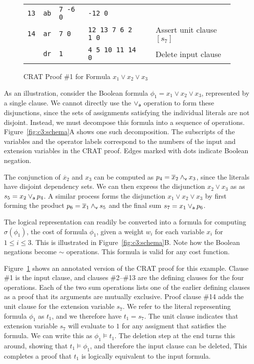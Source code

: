 \documentclass{llncs}
\newcommand{\pand}{\mathbin{\land_{\sf v}}}
\newcommand{\por}{\mathbin{\lor_{\sf a}}}
\newcommand{\tautology}{1}
\newcommand{\obar}[1]{\overline{#1}}
\newcommand{\oneminus}{{\sim}}
\newcommand{\turnstile}{\models}
\newcommand{\cost}{\sigma}
\begin{document}
\begin{figure}
{\begin{tabular}{llllll}
    {\tt 13} & {\tt ab}  & {\tt  7 -6 0}    & {\tt -12 0} & &  \\  %
    {\tt 14} & {\tt ar}  & {\tt 7 0} & {\tt 12 13 7 6 2 1 0} & & Assert unit clause $[s_7]$ \\
             & {\tt dr}  & {\tt 1}  & {\tt 4 5 10 11 14 0} & & Delete input clause \\
  \end{tabular}
  }
  \caption{CRAT Proof \#1 for Formula $x_1 \lor x_2 \lor x_3$}
  \label{fig:c3:crat}
\end{figure}
    
As an illustration, consider the Boolean formula
$\phi_1 = x_1 \lor x_2 \lor x_3$,
represented by a single clause.  We cannot directly use the
$\por$ operation to form these disjunctions, since the sets of assignments
satisfying the individual literals are not disjoint.  Instead, we must
decompose this formula into a sequence of operations.
Figure~\ref{fig:c3:schema}A shows one such decomposition.
The subscripts of the variables and the operator labels correspond to
the numbers of the input and extension variables in the CRAT proof.
Edges marked with dots indicate Boolean negation.

The conjunction of $\obar{x}_2$ and $x_3$ can be computed as $p_4 =
\obar{x}_2 \pand x_3$, since the literals have disjoint dependency
sets. We can then express the disjunction $x_2 \lor x_3$ as
as $s_5 = x_2 \por p_4$.  A similar process forms the
disjunction $x_1 \lor x_2 \lor x_3$ by first forming the product $p_6
= \obar{x}_1 \pand s_5$ and the final sum $s_7 = x_1 \por p_6$.

The logical representation can readily be converted into a formula for
computing $\cost(\phi_1)$, the cost of formula $\phi_1$, given a weight
$w_i$ for each variable $x_i$ for $1 \leq i \leq 3$.  This is
illustrated in Figure~\ref{fig:c3:schema}B\@.  Note how the Boolean
negations become $\oneminus$ operations.  This formula is valid for
any cost function.

Figure~\ref{fig:c3:crat} shows an annotated version of the CRAT proof
for this example.  Clause \#1
is the input clause, and
clauses \#2--\#13 are the defining clauses for the four operations.
Each of the two sum operations lists one of the earlier defining
clauses as a proof that its arguments are mutually exclusive.
Proof clause \#14 adds the unit clause for the extension variable $s_7$.
We refer to the literal representing formula $\phi_1$ as $t_1$,
and we therefore have $t_1 = s_7$.
The unit clause indicates that extension variable $s_7$ will evaluate to
$\tautology$  for any assigment that satisfies the formula.  We
can write this as $\phi_1 \turnstile t_1$.  The
deletion step at the end turns this around, showing that
$t_1 \turnstile \phi_1$,
and therefore the input clause can be deleted, This
completes a proof that $t_1$ is logically
equivalent to the input formula.
\end{document}
